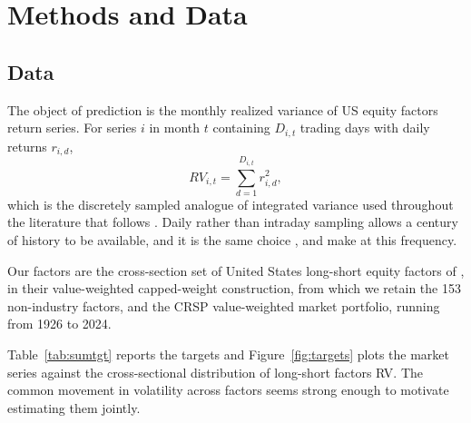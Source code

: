 \documentclass[preprint,12pt,authoryear]{elsarticle}
\begin{document}
\section{Methods and Data}
\label{sec:methods}

\subsection{Data}
\label{sec:data}

The object of prediction is the monthly realized variance of US equity factors return series. For series $i$ in month $t$ containing $D_{i,t}$ trading days with daily returns $r_{i,d}$,
\begin{equation}
RV_{i,t} = \sum_{d=1}^{D_{i,t}} r_{i,d}^{2},
\label{eq:rv}
\end{equation}
which is the discretely sampled analogue of integrated variance used throughout the literature that follows \citet{andersenbollerslev1998}. Daily rather than
intraday sampling allows a century of history to be available, and it is the same choice \citet{schwert1989}, \citet{paye2012} and \citet{nonejad2017} make
at this frequency.

Our factors are the cross-section set of United States long-short equity factors of \citet{jensenkellypedersen2023}, in their value-weighted capped-weight construction, from which we retain the 153 non-industry factors, and the CRSP value-weighted market portfolio, running from 1926 to 2024. 

Table~\ref{tab:sumtgt} reports the targets and Figure~\ref{fig:targets} plots the market series against the cross-sectional distribution of long-short factors RV. The common movement in volatility across factors seems strong enough to motivate estimating them jointly.
\end{document}
